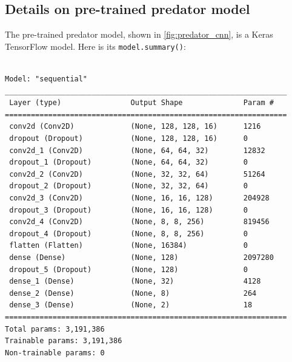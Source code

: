 \documentclass[acmtog]{acmart}
\begin{document}
\subsection{Details on pre-trained predator model}
The pre-trained predator model, shown in \ref{fig:predator_cnn}, is a Keras TensorFlow model. Here is its \texttt{model.summary()}:
\begin{adjustwidth}{1cm}{0cm}
\begin{small}
\begin{verbatim}

Model: "sequential"
_________________________________________________________________
 Layer (type)                Output Shape              Param #
=================================================================
 conv2d (Conv2D)             (None, 128, 128, 16)      1216
 dropout (Dropout)           (None, 128, 128, 16)      0
 conv2d_1 (Conv2D)           (None, 64, 64, 32)        12832
 dropout_1 (Dropout)         (None, 64, 64, 32)        0
 conv2d_2 (Conv2D)           (None, 32, 32, 64)        51264
 dropout_2 (Dropout)         (None, 32, 32, 64)        0
 conv2d_3 (Conv2D)           (None, 16, 16, 128)       204928
 dropout_3 (Dropout)         (None, 16, 16, 128)       0
 conv2d_4 (Conv2D)           (None, 8, 8, 256)         819456
 dropout_4 (Dropout)         (None, 8, 8, 256)         0
 flatten (Flatten)           (None, 16384)             0
 dense (Dense)               (None, 128)               2097280
 dropout_5 (Dropout)         (None, 128)               0
 dense_1 (Dense)             (None, 32)                4128
 dense_2 (Dense)             (None, 8)                 264
 dense_3 (Dense)             (None, 2)                 18
=================================================================
Total params: 3,191,386
Trainable params: 3,191,386
Non-trainable params: 0
\end{verbatim}
\end{small}
\end{adjustwidth}


\end{document}
